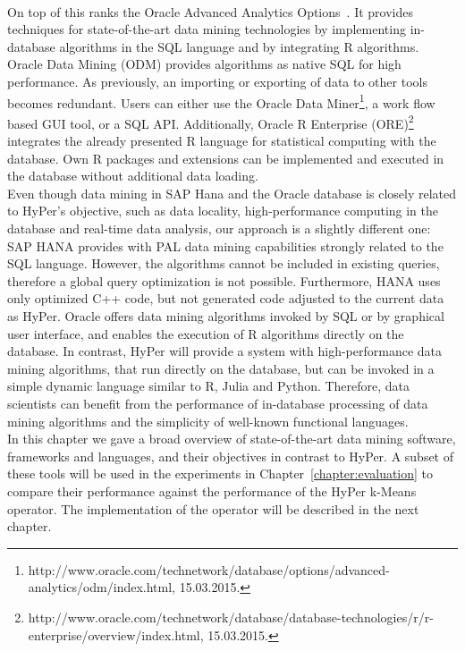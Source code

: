 \\
On top of this ranks the Oracle Advanced Analytics Options~\parencite{oracle}. It provides techniques for state-of-the-art data mining technologies by implementing in-database algorithms in the SQL language and by integrating R algorithms. Oracle Data Mining (ODM) provides algorithms as native SQL for high performance. As previously, an importing or exporting of data to other tools becomes redundant. Users can either use the Oracle Data Miner\footnote{http://www.oracle.com/technetwork/database/options/advanced-analytics/odm/index.html, 15.03.2015.}, a work flow based GUI tool, or a SQL API. Additionally, Oracle R Enterprise (ORE)\footnote{http://www.oracle.com/technetwork/database/database-technologies/r/r-enterprise/overview/index.html, 15.03.2015.} integrates the already presented R language for statistical computing with the database. Own R packages and extensions can be implemented and executed in the database without additional data loading.
\\
Even though data mining in SAP Hana and the Oracle database is closely related to HyPer's objective, such as data locality, high-performance computing in the database and real-time data analysis, our approach is a slightly different one: SAP HANA provides with PAL data mining capabilities strongly related to the SQL language. However, the algorithms cannot be included in existing queries, therefore a global query optimization is not possible. Furthermore, HANA uses only optimized C++ code, but not generated code adjusted to the current data as HyPer. Oracle offers data mining algorithms invoked by SQL or by graphical user interface, and enables the execution of R algorithms directly on the database. In contrast, HyPer will provide a system with high-performance data mining algorithms, that run directly on the database, but can be invoked in a simple dynamic language similar to R, Julia and Python. Therefore, data scientists can benefit from the performance of in-database processing of data mining algorithms and the simplicity of well-known functional languages.
\\
In this chapter we gave a broad overview of state-of-the-art data mining software, frameworks and languages, and their objectives in contrast to HyPer. A subset of these tools will be used in the experiments in Chapter~\ref{chapter:evaluation} to compare their performance against the performance of the HyPer k-Means operator. The implementation of the operator will be described in the next chapter.

